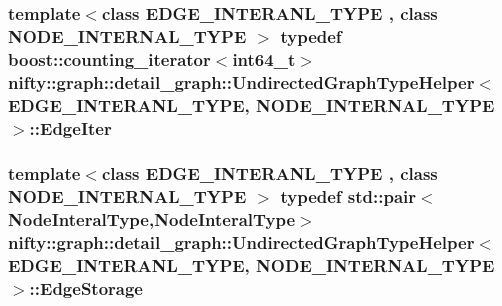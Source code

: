 \subsubsection[{Edge\+Iter}]{\setlength{\rightskip}{0pt plus 5cm}template$<$class E\+D\+G\+E\+\_\+\+I\+N\+T\+E\+R\+A\+N\+L\+\_\+\+T\+Y\+P\+E , class N\+O\+D\+E\+\_\+\+I\+N\+T\+E\+R\+N\+A\+L\+\_\+\+T\+Y\+P\+E $>$ typedef boost\+::counting\+\_\+iterator$<$int64\+\_\+t$>$ {\bf nifty\+::graph\+::detail\+\_\+graph\+::\+Undirected\+Graph\+Type\+Helper}$<$ E\+D\+G\+E\+\_\+\+I\+N\+T\+E\+R\+A\+N\+L\+\_\+\+T\+Y\+P\+E, N\+O\+D\+E\+\_\+\+I\+N\+T\+E\+R\+N\+A\+L\+\_\+\+T\+Y\+P\+E $>$\+::{\bf Edge\+Iter}}\label{structnifty_1_1graph_1_1detail__graph_1_1UndirectedGraphTypeHelper_adcb9afc6e254d52edcb21e1be522dce7}
\hypertarget{structnifty_1_1graph_1_1detail__graph_1_1UndirectedGraphTypeHelper_a43eb7f2cfb5036f87e9496bb6b8d064d}{}
\subsubsection[{Edge\+Storage}]{\setlength{\rightskip}{0pt plus 5cm}template$<$class E\+D\+G\+E\+\_\+\+I\+N\+T\+E\+R\+A\+N\+L\+\_\+\+T\+Y\+P\+E , class N\+O\+D\+E\+\_\+\+I\+N\+T\+E\+R\+N\+A\+L\+\_\+\+T\+Y\+P\+E $>$ typedef std\+::pair$<${\bf Node\+Interal\+Type},{\bf Node\+Interal\+Type}$>$ {\bf nifty\+::graph\+::detail\+\_\+graph\+::\+Undirected\+Graph\+Type\+Helper}$<$ E\+D\+G\+E\+\_\+\+I\+N\+T\+E\+R\+A\+N\+L\+\_\+\+T\+Y\+P\+E, N\+O\+D\+E\+\_\+\+I\+N\+T\+E\+R\+N\+A\+L\+\_\+\+T\+Y\+P\+E $>$\+::{\bf Edge\+Storage}}\label{structnifty_1_1graph_1_1detail__graph_1_1UndirectedGraphTypeHelper_a43eb7f2cfb5036f87e9496bb6b8d064d}
\hypertarget{structnifty_1_1graph_1_1detail__graph_1_1UndirectedGraphTypeHelper_a626e3edd4cc8c7e33ec89e6a7454561a}{}
